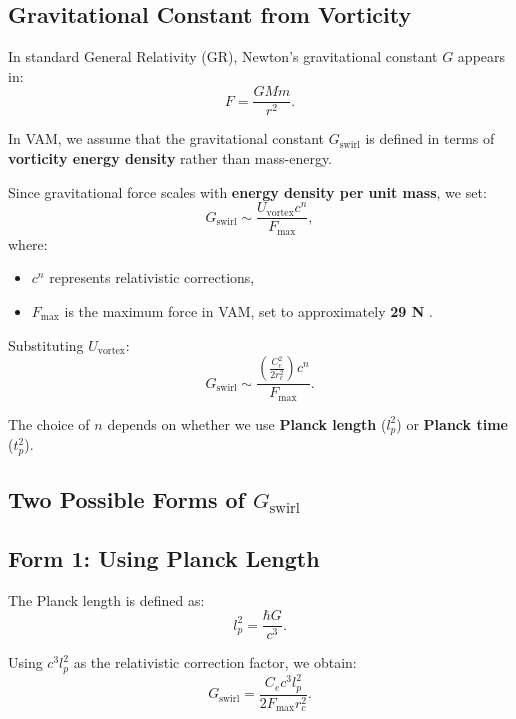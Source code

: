 \subsection*{Gravitational Constant from Vorticity}
In standard General Relativity (GR), Newton's gravitational constant \( G \) appears in:
\begin{equation*}
    F = \frac{GMm}{r^2}.
\end{equation*}

In VAM, we assume that the gravitational constant \(  G_\text{swirl} \) is defined in terms of \textbf{vorticity energy density} rather than mass-energy.

Since gravitational force scales with \textbf{energy density per unit mass}, we set:
\begin{equation*}
    G_\text{swirl} \sim \frac{U_\text{vortex} c^n}{F_{\max}},
\end{equation*}
where:
\begin{itemize}
    \item \( c^n \) represents relativistic corrections,
    \item \( F_{\max} \) is the maximum force in VAM, set to approximately \textbf{29 N} \cite{schiller_max_force}.
\end{itemize}

Substituting \( U_\text{vortex} \):
\begin{equation*}
    G_\text{swirl} \sim \frac{\left( \frac{C_e^2}{2 r_c^2} \right) c^n}{F_{\max}}.
\end{equation*}

The choice of \( n \) depends on whether we use \textbf{Planck length} (\( l_p^2 \)) or \textbf{Planck time} (\( t_p^2 \)).

\subsection*{Two Possible Forms of \(  G_\text{swirl} \)}
\subsection*{Form 1: Using Planck Length}
The Planck length is defined as:
\begin{equation*}
    l_p^2 = \frac{\hbar G}{c^3}.
\end{equation*}

Using \( c^3 l_p^2 \) as the relativistic correction factor, we obtain:
\begin{equation*}
    G_\text{swirl} = \frac{C_e c^3 l_p^2}{2 F_{\max} r_c^2}.
\end{equation*}


